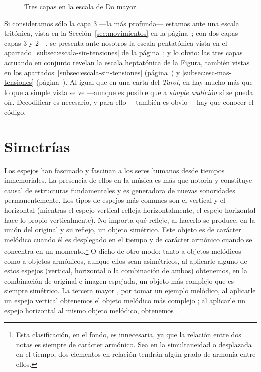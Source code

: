\documentclass[a4paper,12pt]{article}
\begin{document}
  \begin{figure}[ht]
  \centering
  \caption{Tres capas en la escala de Do mayor.}\label{fig:capas-escala}
  \end{figure}

\begin{multicols}{2}

\noindent Si consideramos sólo la capa 3 ---la más profunda--- estamos ante una escala tritónica, vista en la Sección~\ref{sec:movimientos} en la página~\pageref{sec:movimientos}; con dos capas ---capas 3 y 2---, se presenta ante nosotros la escala pentatónica vista en el apartado~\ref{subsec:escala-sin-tensiones} de la página~\pageref{subsec:escala-sin-tensiones}; y lo obvio: las tres capas actuando en conjunto revelan la escala heptatónica de la Figura, también vistas en los apartados~\ref{subsec:escala-sin-tensiones} (página~\pageref{subsec:escala-sin-tensiones}) y \ref{subsec:esc-mas-tensiones} (página~\pageref{subsec:esc-mas-tensiones}). Al igual que en una carta del \emph{Tarot}, en  hay mucho más que lo que a simple vista se ve ---aunque es posible que a \emph{simple audición} sí se pueda oír. Decodificar es necesario, y para ello ---también es obvio--- hay que conocer el código.

\section{Simetrías}\label{sec:simetrias}
Los espejos han fascinado y fascinan a los seres humanos desde tiempos inmemoriales. La presencia de ellos en la música es más que notoria y constituye causal de estructuras fundamentales y es generadora de nuevas sonoridades permanentemente.  Los tipos de espejos más comunes son el vertical y el horizontal (mientras el espejo vertical refleja horizontalmente, el espejo horizontal hace lo propio verticalmente). No importa qué refleje, al hacerlo se produce, en la unión del original y su reflejo, un objeto simétrico. Este objeto es de carácter melódico cuando él es desplegado en el tiempo y de carácter armónico cuando se concentra en un momento.\footnote{Esta clasificación, en el fondo, es innecesaria, ya que la relación entre dos notas es siempre de carácter armónico. Sea en la simultaneidad o desplazada en el tiempo, dos elementos en relación tendrán algún grado de armonía entre ellos.} O dicho de otro modo: tanto a objetos melódicos como a objetos armónicos, aunque ellos sean asimétricos, al aplicarle alguno de estos espejos (vertical, horizontal o la combinación de ambos) obtenemos, en la combinación de original e imagen espejada, un objeto más complejo que es siempre simétrico. La tercera mayor \hbox{,} por tomar un ejemplo melódico, al aplicarle un espejo vertical obtenemos el objeto melódico más complejo \hbox{;} al aplicarle un espejo horizontal al mismo objeto melódico, obtenemos \hbox{.}


\end{multicols}
\end{document}

